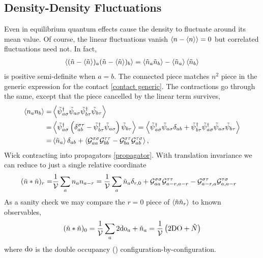 \subsection{Density-Density Fluctuations}\label{sec:density fluctuations}

Even in equilibrium quantum effects cause the density to fluctuate around its mean value.
Of course, the linear fluctuations vanish $\left\langle n - \left\langle n \right\rangle \right\rangle = 0$ but correlated fluctuations need not.
In fact,
\begin{align}
    \left\langle  (\tilde{n}-\left\langle \tilde{n} \right\rangle)_a (\tilde{n}-\left\langle \tilde{n} \right\rangle)_b  \right\rangle
    =
    \left\langle  \tilde{n}_a \tilde{n}_b  \right\rangle - \left\langle \tilde{n}_a \right\rangle \left\langle \tilde{n}_b \right\rangle
\end{align}
is positive semi-definite when $a=b$.
The connected piece matches $n^2$ piece in the generic expression for the contact \eqref{contact generic}.
The contractions go through the same, except that the piece cancelled by the linear term survives,
\begin{align}
    \left\langle n_a n_b \right\rangle
    =&
    \left\langle 
        \tilde{\psi}{}^{\dagger}_{a\sigma} \tilde{\psi}_{a\sigma} \tilde{\psi}{}^{\dagger}_{b\tau} \tilde{\psi}_{b\tau}
         \right\rangle
    \nonumber\\
    =&
    \left\langle 
        \tilde{\psi}{}^{\dagger}_{a\sigma} \left(\delta_{ab}^{\sigma\tau} - \tilde{\psi}{}^{\dagger}_{b\tau} \tilde{\psi}_{a\sigma}\right) \tilde{\psi}_{b\tau}
         \right\rangle
    =
    \left\langle 
        \tilde{\psi}{}^{\dagger}_{a\sigma} \tilde{\psi}_{a\sigma} \delta_{ab}
    +   \tilde{\psi}{}^{\dagger}_{b\tau} \tilde{\psi}{}^{\dagger}_{a\sigma} \tilde{\psi}_{a\sigma} \tilde{\psi}_{b\tau}
     \right\rangle
    \nonumber\\
    =&
    \left\langle \tilde{n}_a \right\rangle \delta_{ab}
    +
    \left\langle 
        \mathcal{G}^{\sigma\sigma}_{aa} \mathcal{G}^{\tau\tau}_{bb}
    -   \mathcal{G}^{\sigma\tau}_{ba} \mathcal{G}^{\tau\sigma}_{ab}
     \right\rangle,
\end{align}
Wick contracting into propagators \eqref{propagator}.
With translation invariance we can reduce to just a single relative coordinate
\begin{align}
    (\tilde{n}*\tilde{n})_r 
    =&
    \frac{1}{\mathcal{V}} \sum_a n_a n_{a-r}
    =
    \frac{1}{\mathcal{V}} \sum_a \tilde{n}_a \delta_{r,0}
    +   \mathcal{G}^{\sigma\sigma}_{aa} \mathcal{G}^{\tau\tau}_{a-r,a-r}
    -   \mathcal{G}^{\sigma\tau}_{a-r,a} \mathcal{G}^{\tau\sigma}_{a,a-r}
    \label{eq:nn}
\end{align}
As a sanity check we may compare the $r=0$ piece of $\left\langle \tilde{n}\tilde{n}_r \right\rangle$ to known observables,
\begin{align}
    (\tilde{n}*\tilde{n})_0 = \frac{1}{\mathcal{V}}\sum_a 2 \textrm{do}_a + \tilde{n}_a = \frac{1}{\mathcal{V}}\left( 2 \textrm{DO} + \tilde{N} \right)
\end{align}
where $\textrm{do}$ is the double occupancy () configuration-by-configuration.

